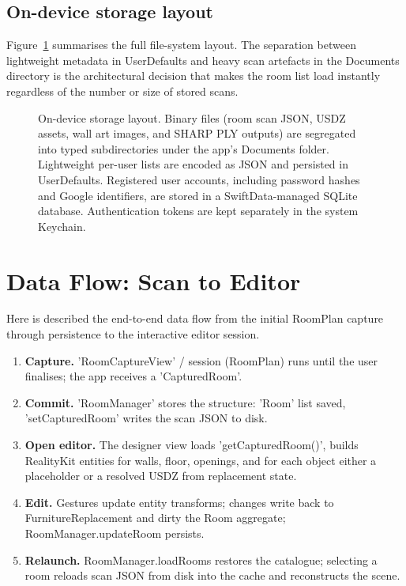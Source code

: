 \subsection{On-device storage layout}

Figure~\ref{fig:storage_layout} summarises the full file-system layout. The separation between lightweight metadata in UserDefaults and heavy scan artefacts in the Documents directory is the architectural decision that makes the room list load instantly regardless of the number or size of stored scans.

\begin{figure}[H]
\centering

\caption{On-device storage layout. Binary files (room scan JSON, USDZ assets, wall art images, and SHARP PLY outputs) are segregated into typed subdirectories under the app's Documents folder. Lightweight per-user lists are encoded as JSON and persisted in UserDefaults. Registered user accounts, including password hashes and Google identifiers,  are stored in a SwiftData-managed SQLite database. Authentication tokens are kept separately in the system Keychain.}
\label{fig:storage_layout}
\end{figure}

\section{Data Flow: Scan to Editor}

Here is described the end-to-end data flow from the initial RoomPlan capture through persistence to the interactive editor session.

\begin{enumerate}
    \item \textbf{Capture.} 'RoomCaptureView' / session (RoomPlan) runs until the user finalises; the app receives a 'CapturedRoom'.

    \item \textbf{Commit.} 'RoomManager' stores the structure: 'Room' list saved, 'setCapturedRoom' writes the scan JSON to disk.

    \item \textbf{Open editor.} The designer view loads 'getCapturedRoom()', builds RealityKit entities for walls, floor, openings, and for each object either a placeholder or a resolved USDZ from replacement state.

    \item \textbf{Edit.} Gestures update entity transforms; changes write back to FurnitureReplacement and dirty the Room aggregate; RoomManager.updateRoom persists.

    \item \textbf{Relaunch.} RoomManager.loadRooms restores the catalogue; selecting a room reloads scan JSON from disk into the cache and reconstructs the scene.
\end{enumerate}

